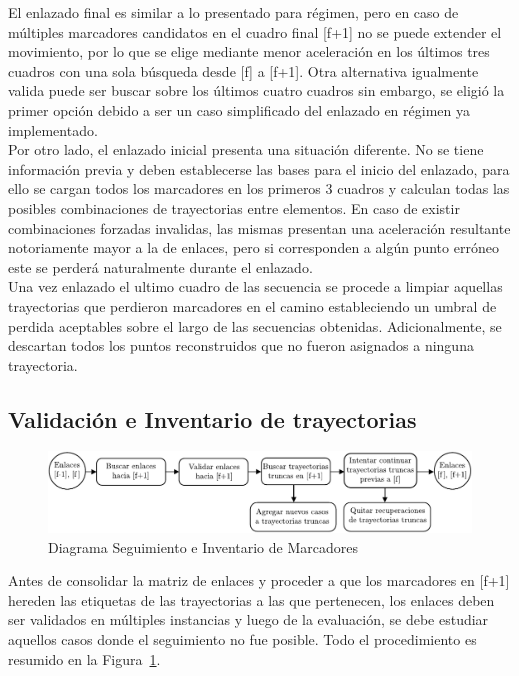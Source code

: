 El enlazado final es similar a lo presentado para régimen, pero en caso de múltiples marcadores candidatos en el cuadro final [f+1] no se puede extender el movimiento, por lo que se elige mediante menor aceleración en los últimos tres cuadros con una sola búsqueda desde [f] a [f+1]. Otra alternativa igualmente valida puede ser buscar sobre los últimos cuatro cuadros sin embargo, se eligió la primer opción debido a ser un caso simplificado del enlazado en régimen ya implementado. 
\\ 

Por otro lado, el enlazado inicial presenta una situación diferente. No se tiene información previa y deben establecerse las bases para el inicio del enlazado, para ello se cargan todos los marcadores en los primeros 3 cuadros y calculan todas las posibles combinaciones de trayectorias entre elementos. En caso de existir combinaciones forzadas invalidas, las mismas presentan una aceleración resultante notoriamente mayor a la de enlaces, pero si corresponden a algún punto erróneo este se perderá naturalmente durante el enlazado.
\\ 

Una vez enlazado el ultimo cuadro de las secuencia se procede a limpiar aquellas trayectorias que perdieron marcadores en el camino estableciendo un umbral de perdida aceptables sobre el largo de las secuencias obtenidas. Adicionalmente, se descartan todos los puntos reconstruidos que no fueron asignados a ninguna trayectoria. 


\subsection{Validación e Inventario de trayectorias}

\begin{figure}[ht!]
\hspace{-1cm}
\includegraphics[scale=0.71]{img/Tracking/diagrama_inventario_seguimiento}
\caption{Diagrama Seguimiento e Inventario de Marcadores}
\label{diagrama_inventario_seguimiento}
\end{figure}

Antes de consolidar la matriz de enlaces y proceder a que los marcadores en [f+1] hereden las etiquetas de las trayectorias a las que pertenecen, los enlaces deben ser validados en múltiples instancias y luego de la evaluación, se debe estudiar aquellos casos donde el seguimiento no fue posible. Todo el procedimiento es resumido en la Figura~\ref{diagrama_inventario_seguimiento}.

